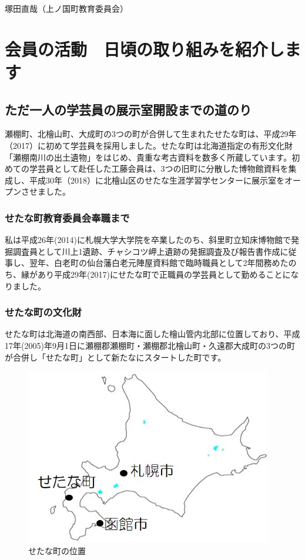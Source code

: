 \documentclass[a4j,11pt,twocolumn,openany]{jsbook}
\begin{document}
\begin{flushright}
	塚田直哉（上ノ国町教育委員会）
\end{flushright}

\chapter{会員の活動　日頃の取り組みを紹介します}

\section{ただ一人の学芸員の展示室開設までの道のり}
瀬棚町、北檜山町、大成町の3つの町が合併して生まれたせたな町は、平成29年（2017）に初めて学芸員を採用しました。せたな町は北海道指定の有形文化財「瀬棚南川の出土遺物」をはじめ、貴重な考古資料を数多く所蔵しています。初めての学芸員として赴任した工藤会員は、3つの旧町に分散した博物館資料を集成し、平成30年（2018）に北檜山区のせたな生涯学習学センターに展示室をオープンさせました。

\subsection{せたな町教育委員会奉職まで}
私は平成26年(2014)に札幌大学大学院を卒業したのち、斜里町立知床博物館で発掘調査員として川上1遺跡、チャシコツ岬上遺跡の発掘調査及び報告書作成に従事し、翌年、白老町の仙台藩白老元陣屋資料館で臨時職員として2年間務めたのち、縁があり平成29年(2017)にせたな町で正職員の学芸員として勤めることになりました。

\subsection{せたな町の文化財}

せたな町は北海道の南西部、日本海に面した檜山管内北部に位置しており、平成17年(2005)年9月1日に瀬棚郡瀬棚町・瀬棚郡北檜山町・久遠郡大成町の3つの町が合併し「せたな町」として新たなにスタートした町です。

\begin{figure}[H]
	\centering
	\includegraphics[width=0.8\linewidth]{fig/04_Kudo/fig01.jpg}
	\caption{せたな町の位置}
	\label{}
\end{figure}
\end{document}
